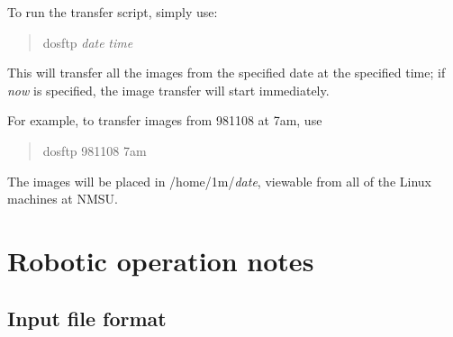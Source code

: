 \documentclass[10pt]{report}
\begin{document}
To run the transfer script, simply use:
\begin{quote}
dosftp \textit{date} \textit{time}
\end{quote}
This will transfer all the images from the specified date at the
specified time; if \textit{now} is specified, the image transfer will
start immediately.

For example, to transfer images from 981108 at 7am, use
\begin{quote}
dosftp 981108 7am
\end{quote}

The images will be placed in /home/1m/\textit{date}, viewable from all of
the Linux machines at NMSU.

%
%
%
%

\chapter{Robotic operation notes}

\section{Input file format}
\end{document}
